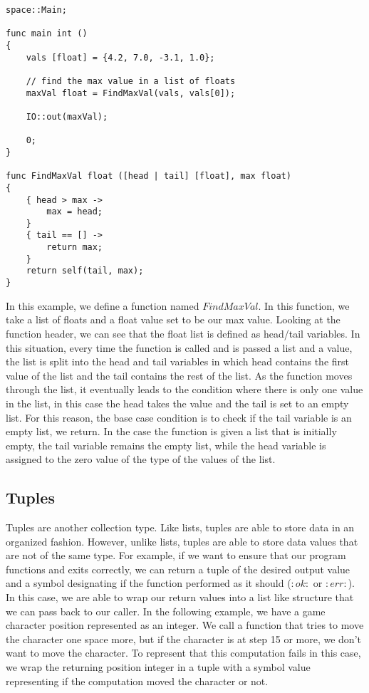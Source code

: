 \documentclass{article}
\begin{document}
\begin{lstlisting}
space::Main;

func main int ()
{
	vals [float] = {4.2, 7.0, -3.1, 1.0};

	// find the max value in a list of floats
	maxVal float = FindMaxVal(vals, vals[0]);

	IO::out(maxVal);

	0;
}

func FindMaxVal float ([head | tail] [float], max float)
{
	{ head > max ->
		max = head;
	}
	{ tail == [] ->
		return max;
	}
	return self(tail, max);
}
\end{lstlisting}

In this example, we define a function named $FindMaxVal$. In this function, we take a list of floats and a float value set to be our max value. Looking at the function
header, we can see that the float list is defined as head/tail variables. In this situation, every time the function is called and is passed a list and a value, the list
is split into the head and tail variables in which head contains the first value of the list and the tail contains the rest of the list. As the function moves through the
list, it eventually leads to the condition where there is only one value in the list, in this case the head takes the value and the tail is set to an empty list. For this
reason, the base case condition is to check if the tail variable is an empty list, we return. In the case the function is given a list that is initially empty, the tail
variable remains the empty list, while the head variable is assigned to the zero value of the type of the values of the list.

\subsection{Tuples}

Tuples are another collection type. Like lists, tuples are able to store data in an organized fashion. However, unlike lists, tuples are able to store data values that are
not of the same type. For example, if we want to ensure that our program functions and exits correctly, we can return a tuple of the desired output value and a symbol designating
if the function performed as it should ($:ok:$ or $:err:$). In this case, we are able to wrap our return values into a list like structure that we can pass back to our caller. In
the following example, we have a game character position represented as an integer. We call a function that tries to move the character one space more, but if the character is
at step 15 or more, we don't want to move the character. To represent that this computation fails in this case, we wrap the returning position integer in a tuple with a symbol
value representing if the computation moved the character or not.
\end{document}
